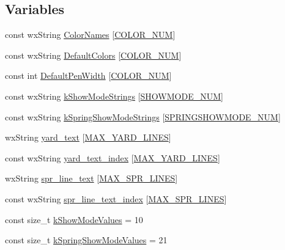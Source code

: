 \subsection*{Variables}
\begin{DoxyCompactItemize}
\item 
const wx\-String \hyperlink{a00191_a7acbbf3434fafe32a73716825cf271aa}{Color\-Names} \mbox{[}\hyperlink{a00191_a09f513be9cbd80355eda10ee8e4059e2a1ad5b60f3b4357df62b270dc435e151d}{C\-O\-L\-O\-R\-\_\-\-N\-U\-M}\mbox{]}
\item 
const wx\-String \hyperlink{a00191_a3076b2817e7f19e5cc9e208cb9d4d800}{Default\-Colors} \mbox{[}\hyperlink{a00191_a09f513be9cbd80355eda10ee8e4059e2a1ad5b60f3b4357df62b270dc435e151d}{C\-O\-L\-O\-R\-\_\-\-N\-U\-M}\mbox{]}
\item 
const int \hyperlink{a00191_a88920aef299a66dd1f54a17d60872bb0}{Default\-Pen\-Width} \mbox{[}\hyperlink{a00191_a09f513be9cbd80355eda10ee8e4059e2a1ad5b60f3b4357df62b270dc435e151d}{C\-O\-L\-O\-R\-\_\-\-N\-U\-M}\mbox{]}
\item 
const wx\-String \hyperlink{a00191_a022c27d9633256775696f727390f8d65}{k\-Show\-Mode\-Strings} \mbox{[}\hyperlink{a00191_acf773163120190d181b9f53d1fa4bb9ca39ab6edfbd568a04aacfb5ae6a43cb12}{S\-H\-O\-W\-M\-O\-D\-E\-\_\-\-N\-U\-M}\mbox{]}
\item 
const wx\-String \hyperlink{a00191_af0f69d4778ec6c5a8eb06eef348200d8}{k\-Spring\-Show\-Mode\-Strings} \mbox{[}\hyperlink{a00191_ae3fb6f10d83fa2ee9e5cb18156a5b932aaedac2791ff57e50494f873148ddeef3}{S\-P\-R\-I\-N\-G\-S\-H\-O\-W\-M\-O\-D\-E\-\_\-\-N\-U\-M}\mbox{]}
\item 
wx\-String \hyperlink{a00191_af2536937ab0e61abae2a6eac588bd630}{yard\-\_\-text} \mbox{[}\hyperlink{a00191_ad80cbf96e4b808112d8433ff73da45a8}{M\-A\-X\-\_\-\-Y\-A\-R\-D\-\_\-\-L\-I\-N\-E\-S}\mbox{]}
\item 
const wx\-String \hyperlink{a00191_a8c16498e1a7dfff8f07c031d6795f940}{yard\-\_\-text\-\_\-index} \mbox{[}\hyperlink{a00191_ad80cbf96e4b808112d8433ff73da45a8}{M\-A\-X\-\_\-\-Y\-A\-R\-D\-\_\-\-L\-I\-N\-E\-S}\mbox{]}
\item 
wx\-String \hyperlink{a00191_a3ea2bd5fe720a1c305963493018ef961}{spr\-\_\-line\-\_\-text} \mbox{[}\hyperlink{a00191_af967bcf8c2a02116db262bf1e1777a1a}{M\-A\-X\-\_\-\-S\-P\-R\-\_\-\-L\-I\-N\-E\-S}\mbox{]}
\item 
const wx\-String \hyperlink{a00191_a7a6ae3e09522a20c3bb37d6b8eacb202}{spr\-\_\-line\-\_\-text\-\_\-index} \mbox{[}\hyperlink{a00191_af967bcf8c2a02116db262bf1e1777a1a}{M\-A\-X\-\_\-\-S\-P\-R\-\_\-\-L\-I\-N\-E\-S}\mbox{]}
\item 
const size\-\_\-t \hyperlink{a00191_a9f04f33b4133efadaca3371489a3e3e0}{k\-Show\-Mode\-Values} = 10
\item 
const size\-\_\-t \hyperlink{a00191_ad4adeccc0bb8604edd3f05ef8e639fcd}{k\-Spring\-Show\-Mode\-Values} = 21
\end{DoxyCompactItemize}



